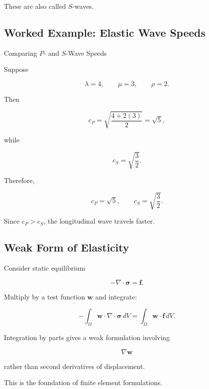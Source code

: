 These are also called \(S\)-waves.

\subsection{Worked Example: Elastic Wave Speeds}
\label{subsec:worked-elastic-wave-speed}

\begin{workedexamplebox}{Comparing \(P\)- and \(S\)-Wave Speeds}

Suppose

\[
\lambda=4,
\qquad
\mu=3,
\qquad
\rho=2.
\]

Then

\[
c_P
=
\sqrt{
\frac{4+2(3)}
{2}
}
=
\sqrt{5},
\]

while

\[
c_S
=
\sqrt{
\frac{3}{2}
}.
\]

Therefore,

\begin{answerbox}
\[
\boxed{
c_P=\sqrt{5},
\qquad
c_S=\sqrt{\frac32}.
}
\]
\end{answerbox}

Since \(c_P>c_S\), the longitudinal wave travels faster.

\end{workedexamplebox}

\subsection{Weak Form of Elasticity}
\label{subsec:weak-form-elasticity}

Consider static equilibrium

\[
-\nabla\cdot\boldsymbol{\sigma}
=
\mathbf{f}.
\]

Multiply by a test function \(\mathbf{w}\) and integrate:

\[
-\int_\Omega
\mathbf{w}\cdot
\nabla\cdot\boldsymbol{\sigma}
\,dV
=
\int_\Omega
\mathbf{w}\cdot\mathbf{f}
\,dV.
\]

Integration by parts gives a weak formulation involving

\[
\boxed{
\nabla\mathbf{w}
}
\]

rather than second derivatives of displacement.

This is the foundation of finite element formulations.

